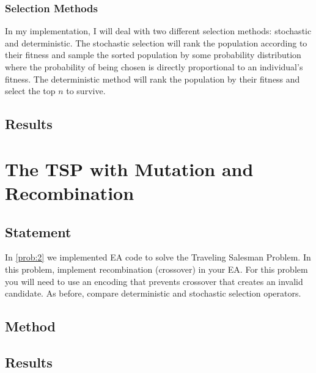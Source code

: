 \documentclass{article}
\begin{document}
\subsubsection{Selection Methods}
In my implementation, I will deal with two different selection methods: stochastic and
deterministic. The stochastic selection will rank the population according to their fitness and
sample the sorted population by some probability distribution where the probability of being chosen
is directly proportional to an individual's fitness. The deterministic method will rank the
population by their fitness and select the top $n$ to survive.


\subsection{Results}

\section{The TSP with Mutation and Recombination}\label{prob:3}

\subsection{Statement}
In \autoref{prob:2} we implemented EA code to solve the Traveling Salesman Problem. In this
problem, implement recombination (crossover) in your EA. For this problem you will need to use an
encoding that prevents crossover that creates an invalid candidate. As before, compare
deterministic and stochastic selection operators.

\subsection{Method}

\subsection{Results}
\end{document}
